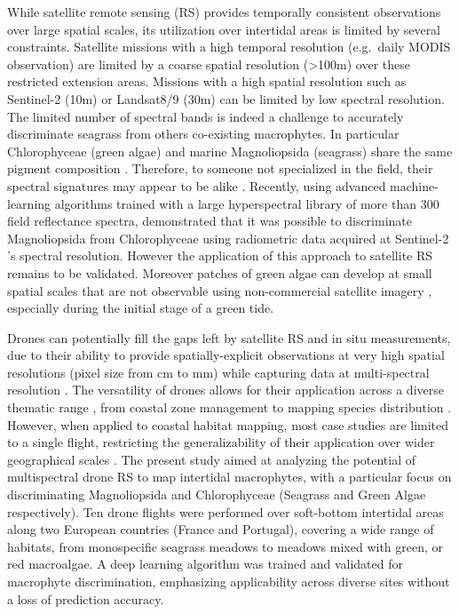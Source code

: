 \documentclass[
  number]{elsarticle}
\begin{document}
While satellite remote sensing (RS) provides temporally consistent
observations over large spatial scales, its utilization over intertidal
areas is limited by several constraints. Satellite missions with a high
temporal resolution (e.g.~daily MODIS observation) are limited by a
coarse spatial resolution (\textgreater100m) over these restricted
extension areas. Missions with a high spatial resolution such as
Sentinel-2 (10m) or Landsat8/9 (30m) can be limited by low spectral
resolution. The limited number of spectral bands is indeed a challenge
to accurately discriminate seagrass from others co-existing macrophytes.
In particular Chlorophyceae (green algae) and marine Magnoliopsida
(seagrass) share the same pigment composition \citetext{\citealp[
]{ralph2002}; \citealp{Douay2022}}. Therefore, to someone not
specialized in the field, their spectral signatures may appear to be
alike \citetext{\citealp[ ]{Davies2023}; \citealp{bannari2022}}.
Recently, using advanced machine-learning algorithms trained with a
large hyperspectral library of more than 300 field reflectance spectra,
\citep{Davies2023} demonstrated that it was possible to discriminate
Magnoliopsida from Chlorophyceae using radiometric data acquired at
Sentinel-2 's spectral resolution. However the application of this
approach to satellite RS remains to be validated. Moreover patches of
green algae can develop at small spatial scales that are not observable
using non-commercial satellite imagery \citep{tuya2013}, especially
during the initial stage of a green tide.

Drones can potentially fill the gaps left by satellite RS and in situ
measurements, due to their ability to provide spatially-explicit
observations at very high spatial resolutions (pixel size from cm to mm)
while capturing data at multi-spectral resolution \citetext{\citealp[
]{fairley2022drone}; \citealp{oh2017use}}. The versatility of drones
allows for their application across a diverse thematic range , from
coastal zone management \citetext{\citealp[ ]{adade2021}; \citealp[
]{casella2020}; \citealp{angnuureng2022}} to mapping species
distribution \citetext{\citealp[ ]{joyce2023}; \citealp[
]{tallam2023}; \citealp[ ]{Roca2022}; \citealp[
]{Roman2021}; \citealp{Brunier2022Topographic}}. However, when applied
to coastal habitat mapping, most case studies are limited to a single
flight, restricting the generalizability of their application over wider
geographical scales \citetext{\citealp[ ]{Roman2021}; \citealp[
]{collin2019improving}; \citealp[
]{rossiter2020uav}; \citealp{Brunier2022Topographic}}. The present study
aimed at analyzing the potential of multispectral drone RS to map
intertidal macrophytes, with a particular focus on discriminating
Magnoliopsida and Chlorophyceae (Seagrass and Green Algae respectively).
Ten drone flights were performed over soft-bottom intertidal areas along
two European countries (France and Portugal), covering a wide range of
habitats, from monospecific seagrass meadows to meadows mixed with
green, or red macroalgae. A deep learning algorithm was trained and
validated for macrophyte discrimination, emphasizing applicability
across diverse sites without a loss of prediction accuracy.
\end{document}
